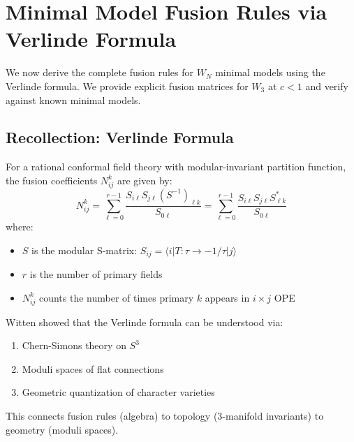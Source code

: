 
\section{Minimal Model Fusion Rules via Verlinde Formula}
\label{sec:minimal-model-fusion}

We now derive the complete fusion rules for $W_N$ minimal models using the 
Verlinde formula. We provide explicit fusion matrices for $W_3$ at $c < 1$ and 
verify against known minimal models.

\subsection{Recollection: Verlinde Formula}
\label{subsec:verlinde-formula-recall}

\begin{theorem}\label{thm:verlinde-general}
For a rational conformal field theory with modular-invariant partition function, 
the fusion coefficients $N_{ij}^k$ are given by:
\begin{equation}
N_{ij}^k = \sum_{\ell=0}^{r-1} \frac{S_{i\ell} S_{j\ell} (S^{-1})_{\ell k}}{S_{0\ell}}
= \sum_{\ell=0}^{r-1} \frac{S_{i\ell} S_{j\ell} S_{\ell k}^*}{S_{0\ell}}
\end{equation}
where:
\begin{itemize}
\item $S$ is the modular S-matrix: $S_{ij} = \langle i | T: \tau \to -1/\tau | j \rangle$
\item $r$ is the number of primary fields
\item $N_{ij}^k$ counts the number of times primary $k$ appears in $i \times j$ OPE
\end{itemize}
\end{theorem}

\begin{remark}\label{rem:witten-verlinde}
Witten showed that the Verlinde formula can be understood via:
\begin{enumerate}
\item Chern-Simons theory on $S^3$
\item Moduli spaces of flat connections
\item Geometric quantization of character varieties
\end{enumerate}

This connects fusion rules (algebra) to topology (3-manifold invariants) to 
geometry (moduli spaces).
\end{remark}

